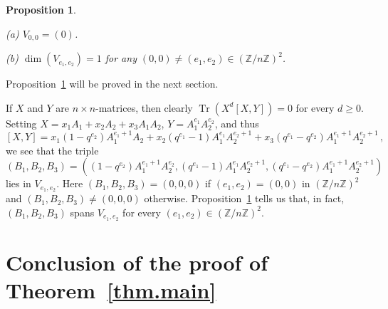 \documentclass[12pt]{amsart}
\numberwithin{equation}{section}
\numberwithin{subsection}{section}
\newtheorem{proposition}[theorem]{Proposition}
\theoremstyle{definition} \newtheorem{definition}[theorem]{Definition}
\newcommand\bbZ{\mathbb{Z}}
\newcommand{\Tr}{\operatorname{Tr}}
\begin{document}
\begin{proposition} \label{prop.final}

\smallskip
{\rm (a)} $V_{0, 0} = (0)$.

\smallskip
{\rm (b)} $\dim(V_{e_1, e_2}) = 1$ for any $(0, 0) \neq (e_1, e_2) \in
(\bbZ/ n \bbZ)^2$.  
\end{proposition}

Proposition~\ref{prop.final} will be proved in the next section.

\begin{remark} \label{rem.commutator} If $X$ and $Y$ are 
$n \times n$-matrices, then clearly
$\Tr(X^d[X, Y]) = 0$ for every $d \geqslant 0$.
Setting $X = x_1 A_1 + x_2 A_2 + x_3 A_1 A_2$, $Y = A_1^{e_1}A_2^{e_2}$,
and thus
\[ [X, Y] = x_1 (1 - q^{e_2}) A_1^{e_1 + 1} A_2 + x_2 (q^{e_1} - 1) 
A_1^{e_1} A_2^{e_2 + 1} + x_3 (q^{e_1} - q^{e_2}) A_1^{e_1 + 1} A_2^{e_2 + 1} 
\, , \]
we see that the triple 
\[ (B_1, B_2, B_3) = ((1 - q^{e_2}) A_1^{e_1 + 1} A_2^{e_2}, (q^{e_1} - 1) 
A_1^{e_1} A_2^{e_2 + 1}, (q^{e_1} - q^{e_2}) A_1^{e_1 + 1} A_2^{e_2 + 1}) 
\]
lies in $V_{e_1, e_2}$. Here $(B_1, B_2, B_3) = (0, 0, 0)$
if $(e_1, e_2) = (0, 0)$ in $(\bbZ/n \bbZ)^2$ and
$(B_1, B_2, B_3) \neq (0, 0, 0)$ otherwise.
Proposition~\ref{prop.final} tells us that, in fact,
$(B_1, B_2, B_3)$ spans $V_{e_1, e_2}$ for every $(e_1, e_2) \in 
(\bbZ/n \bbZ)^2$.
\end{remark}

\section{Conclusion of the proof of Theorem~\ref{thm.main}}
\label{sect.final}
\end{document}
